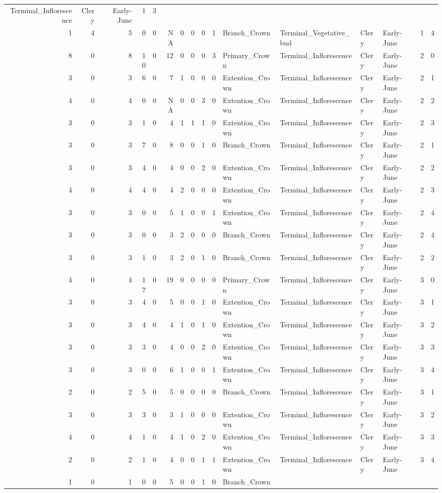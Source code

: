 \documentclass[]{article}
\begin{document}
\begin{longtable}[]{@{}rrrrrrrrrrllllrl@{}}
Terminal\_Inflorescence & Clery & Early-June & 1 & 3\tabularnewline
1 & 4 & 5 & 0 & 0 & NA & 0 & 0 & 0 & 1 & Branch\_Crown &
Terminal\_Vegetative\_bud & Clery & Early-June & 1 & 4\tabularnewline
8 & 0 & 8 & 10 & 0 & 12 & 0 & 0 & 0 & 3 & Primary\_Crown &
Terminal\_Inflorescence & Clery & Early-June & 2 & 0\tabularnewline
3 & 0 & 3 & 6 & 0 & 7 & 1 & 0 & 0 & 0 & Extention\_Crown &
Terminal\_Inflorescence & Clery & Early-June & 2 & 1\tabularnewline
4 & 0 & 4 & 0 & 0 & NA & 0 & 0 & 3 & 0 & Extention\_Crown &
Terminal\_Inflorescence & Clery & Early-June & 2 & 2\tabularnewline
3 & 0 & 3 & 1 & 0 & 4 & 1 & 1 & 1 & 0 & Extention\_Crown &
Terminal\_Inflorescence & Clery & Early-June & 2 & 3\tabularnewline
3 & 0 & 3 & 7 & 0 & 8 & 0 & 0 & 1 & 0 & Branch\_Crown &
Terminal\_Inflorescence & Clery & Early-June & 2 & 1\tabularnewline
3 & 0 & 3 & 4 & 0 & 4 & 0 & 0 & 2 & 0 & Extention\_Crown &
Terminal\_Inflorescence & Clery & Early-June & 2 & 2\tabularnewline
4 & 0 & 4 & 4 & 0 & 4 & 2 & 0 & 0 & 0 & Extention\_Crown &
Terminal\_Inflorescence & Clery & Early-June & 2 & 3\tabularnewline
3 & 0 & 3 & 0 & 0 & 5 & 1 & 0 & 0 & 1 & Extention\_Crown &
Terminal\_Inflorescence & Clery & Early-June & 2 & 4\tabularnewline
3 & 0 & 3 & 0 & 0 & 3 & 2 & 0 & 0 & 0 & Branch\_Crown &
Terminal\_Inflorescence & Clery & Early-June & 2 & 4\tabularnewline
3 & 0 & 3 & 1 & 0 & 3 & 2 & 0 & 1 & 0 & Branch\_Crown &
Terminal\_Inflorescence & Clery & Early-June & 2 & 2\tabularnewline
4 & 0 & 4 & 17 & 0 & 19 & 0 & 0 & 0 & 0 & Primary\_Crown &
Terminal\_Inflorescence & Clery & Early-June & 3 & 0\tabularnewline
3 & 0 & 3 & 4 & 0 & 5 & 0 & 0 & 1 & 0 & Extention\_Crown &
Terminal\_Inflorescence & Clery & Early-June & 3 & 1\tabularnewline
3 & 0 & 3 & 4 & 0 & 4 & 1 & 0 & 1 & 0 & Extention\_Crown &
Terminal\_Inflorescence & Clery & Early-June & 3 & 2\tabularnewline
3 & 0 & 3 & 3 & 0 & 4 & 0 & 0 & 2 & 0 & Extention\_Crown &
Terminal\_Inflorescence & Clery & Early-June & 3 & 3\tabularnewline
3 & 0 & 3 & 0 & 0 & 6 & 1 & 0 & 0 & 1 & Extention\_Crown &
Terminal\_Inflorescence & Clery & Early-June & 3 & 4\tabularnewline
2 & 0 & 2 & 5 & 0 & 5 & 0 & 0 & 0 & 0 & Branch\_Crown &
Terminal\_Inflorescence & Clery & Early-June & 3 & 1\tabularnewline
3 & 0 & 3 & 3 & 0 & 3 & 1 & 0 & 0 & 0 & Extention\_Crown &
Terminal\_Inflorescence & Clery & Early-June & 3 & 2\tabularnewline
4 & 0 & 4 & 1 & 0 & 4 & 1 & 0 & 2 & 0 & Extention\_Crown &
Terminal\_Inflorescence & Clery & Early-June & 3 & 3\tabularnewline
2 & 0 & 2 & 1 & 0 & 4 & 0 & 0 & 1 & 1 & Extention\_Crown &
Terminal\_Inflorescence & Clery & Early-June & 3 & 4\tabularnewline
1 & 0 & 1 & 0 & 0 & 5 & 0 & 0 & 1 & 0 & Branch\_Crown &

\end{longtable}
\end{document}
